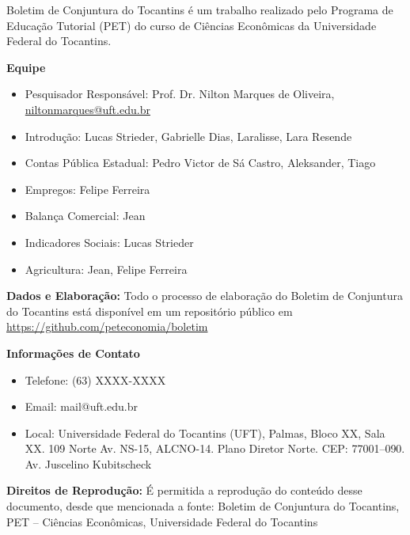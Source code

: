 \begin{tcolorbox}[colback=boxbackground, colframe=boxbackground, arc=0mm, top=15pt]
Boletim de Conjuntura do Tocantins é um trabalho realizado pelo Programa de Educação Tutorial (PET) do curso de Ciências Econômicas da Universidade Federal do Tocantins.
\\
\par{\bf Equipe}
\begin{itemize}
	\item Pesquisador Responsável: Prof. Dr. Nilton Marques de Oliveira, \url{niltonmarques@uft.edu.br}
	\item Introdução: Lucas Strieder, Gabrielle Dias, Laralisse, Lara Resende
	\item Contas Pública Estadual: Pedro Victor de Sá Castro, Aleksander, Tiago
	\item Empregos: Felipe Ferreira
	\item Balança Comercial: Jean
	\item Indicadores Sociais: Lucas Strieder
	\item Agricultura: Jean, Felipe Ferreira
\end{itemize}
\par{\bf Dados e Elaboração:}
Todo o processo de elaboração do Boletim de Conjuntura do Tocantins está disponível em um repositório público em \url{https://github.com/peteconomia/boletim}
\\
\par{\bf Informações de Contato}
\begin{itemize}
	\item{Telefone:} (63) XXXX-XXXX
	\item{Email:} mail@uft.edu.br
	\item{Local:} Universidade Federal do Tocantins (UFT), Palmas, Bloco XX, Sala XX. 109 Norte Av. NS-15, ALCNO-14. Plano Diretor Norte. CEP: 77001--090. Av. Juscelino Kubitscheck
\end{itemize}
\par{\bf Direitos de Reprodução:}
É permitida a reprodução do conteúdo desse documento, desde que mencionada a fonte: Boletim de Conjuntura do Tocantins, PET -- Ciências Econômicas, Universidade Federal do Tocantins
\end{tcolorbox}
